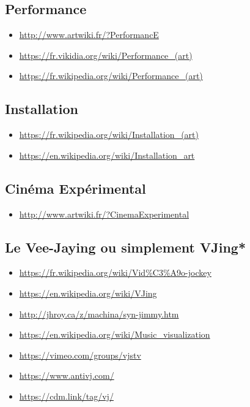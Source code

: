 \documentclass[
  french,
]{book}
\providecommand{\tightlist}{%
  \setlength{\itemsep}{0pt}\setlength{\parskip}{0pt}}
\begin{document}
\hypertarget{evolution_historique_performance}{%
\subsection{Performance}\label{evolution_historique_performance}}

\begin{itemize}
\tightlist
\item
  \url{http://www.artwiki.fr/?PerformancE}
\item
  \url{https://fr.vikidia.org/wiki/Performance_(art)}
\item
  \url{https://fr.wikipedia.org/wiki/Performance_(art)}
\end{itemize}

\hypertarget{evolution_historique_installation}{%
\subsection{Installation}\label{evolution_historique_installation}}

\begin{itemize}
\tightlist
\item
  \url{https://fr.wikipedia.org/wiki/Installation_(art)}
\item
  \url{https://en.wikipedia.org/wiki/Installation_art}
\end{itemize}

\hypertarget{cinuxe9ma-expuxe9rimental}{%
\subsection{Cinéma Expérimental}\label{cinuxe9ma-expuxe9rimental}}

\begin{itemize}
\tightlist
\item
  \url{http://www.artwiki.fr/?CinemaExperimental}
\end{itemize}

\hypertarget{le-vee-jaying-ou-simplement-vjing}{%
\subsection{\texorpdfstring{Le \textbf{Vee-Jaying} ou simplement \textbf{VJing}*}{Le Vee-Jaying ou simplement VJing*}}\label{le-vee-jaying-ou-simplement-vjing}}

\begin{itemize}
\tightlist
\item
  \url{https://fr.wikipedia.org/wiki/Vid\%C3\%A9o-jockey}
\item
  \url{https://en.wikipedia.org/wiki/VJing}
\item
  \url{http://jhroy.ca/z/machina/syn-jimmy.htm}
\item
  \url{https://en.wikipedia.org/wiki/Music_visualization}
\item
  \url{https://vimeo.com/groups/vjstv}
\item
  \url{https://www.antivj.com/}
\item
  \url{https://cdm.link/tag/vj/}
\end{itemize}
\end{document}
